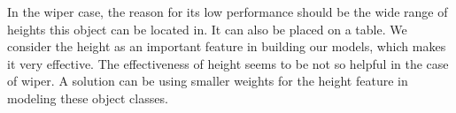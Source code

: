 In the wiper case, the reason for its low performance should be the wide range of heights this object can be located in. It can also be placed on a table.
We consider the height as an important feature in building our models, which makes it very effective.
The effectiveness of height seems to be not so helpful in the case of wiper.
A solution can be using smaller weights for the height feature in modeling these object classes.

\begin{figure} [htp]
   \begin{center}
     \\

\end{center}
\end{figure}
